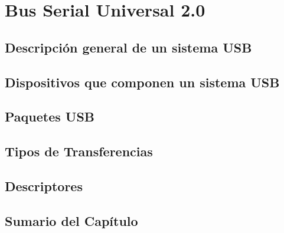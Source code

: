 \chapter{Bus Serial Universal 2.0}
	\label{cap:usb}
	
%			
		\section{Descripción general de un sistema USB}
			\label{usb:desc}
			
		\section{Dispositivos que componen un sistema USB}
			\label{usb:disp}
			
		\section{Paquetes USB}
			\label{usb:pkt}
			
		\section{Tipos de Transferencias}
			\label{usb:xfer}
			
		\section{Descriptores}
			\label{usb:dscr}
			
		\section{Sumario del Capítulo}
			\label{usb:sum}
			